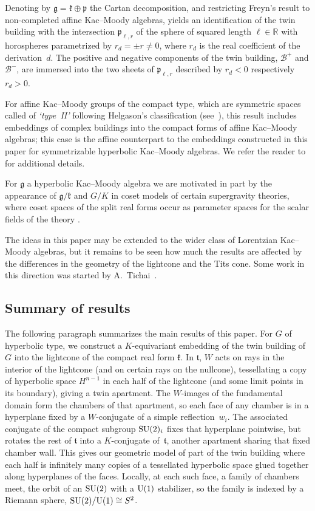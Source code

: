 \documentclass[pdftex]{sigma}
\numberwithin{equation}{section}
\def\R{\mathbb{R}}
\def\cB{\mathcal B}
\def\g{\mathfrak{g}}
\def\fg{\mathfrak{g}}
\def\k{\mathfrak{k}}
\def\fk{\mathfrak{k}}
\def\p{\mathfrak{p}}
\def\ft{\mathfrak{t}}
\begin{document}
Denoting by $\g=\k \oplus \p$ the Cartan decomposition, and restricting Freyn's result to non-completed affine Kac--Moody algebras, yields an identification of the twin building with the intersection $\p_{\ell, r}$ of the sphere of squared length $\ell\in \R$ with horospheres parametrized by $r_d=\pm r\not=0$, where $r_d$ is the real coefficient of the derivation~$d$. The positive and negative components of the twin building, $\cB^+$ and $\cB^-$, are immersed into the two sheets of $\p_{\ell, r}$ described by $r_d<0$ respectively~$r_d>0$.

For affine Kac--Moody groups of the compact type, which are symmetric spaces called of \emph{`type~II'} following Helgason's classification (see~\cite{Freyn15, Helgason01}), this result includes embeddings of complex buildings into the compact forms of affine Kac--Moody algebras; this case is the affine counterpart to the embeddings constructed in this paper for symmetrizable hyperbolic Kac--Moody algebras. We refer the reader to~\cite{Freyn09, Freyn10b, Freyn10a, Freyn10d} for additional details.

For $\g$ a hyperbolic Kac--Moody algebra we are motivated in part by the appearance of $\fg/\fk$ and $G/K$ in coset models of certain supergravity theories, where coset spaces of the split real forms occur as parameter spaces for the scalar fields of the theory \cite{DamourHenneauxNicolai02,Julia85, West01}.

The ideas in this paper may be extended to the wider class of Lorentzian Kac--Moody algebras, but it remains to be seen how much the results are affected by the differences in the geometry of the lightcone and the Tits cone. Some work in this direction was started by A.~Tichai~\cite{Tich14}.

\subsection{Summary of results}\label{subsection:Summary of results}

The following paragraph summarizes the main results of this paper.
For $G$ of hyperbolic type, we construct a $K$-equivariant embedding of the twin building of $G$ into the lightcone of the compact
real form $\fk$. In $\ft$, $W$ acts on rays in the interior of the lightcone (and on certain rays on the nullcone), tessellating a copy of
hyperbolic space $H^{n-1}$ in each half of the lightcone (and some limit points in its boundary), giving a twin apartment. The $W$-images of the fundamental domain form the chambers of that apartment, so each face of any chamber is in a hyperplane fixed by a $W$-conjugate of a simple reflection~$w_i$. The associated conjugate of the compact subgroup ${\rm SU}(2)_i$ fixes that hyperplane pointwise, but rotates the rest of $\ft$ into a $K$-conjugate of~$\ft$, another apartment sharing that fixed chamber wall.
This gives our geometric model of part of the twin building where each half is infinitely many copies of a tessellated hyperbolic space glued together along hyperplanes of the faces. Locally, at each such face, a family of chambers meet, the orbit of an ${\rm SU}(2)$ with a ${\rm U}(1)$ stabilizer, so the family is indexed by a Riemann sphere, ${\rm SU}(2)/{\rm U}(1) \cong S^2$.
\end{document}
